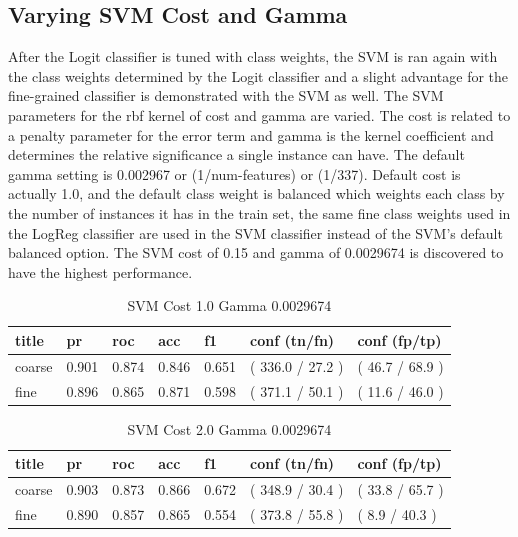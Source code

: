 \documentclass[ms]{nuthesis}
\begin{document}
\subsection{Varying SVM Cost and Gamma}
\label{sect:paramEnd}
\par After the Logit classifier is tuned with class weights, the SVM is ran again with the
class weights determined by the Logit classifier and a slight advantage for the fine-grained
classifier is demonstrated with the SVM as well. The SVM parameters for the rbf
kernel of cost and gamma are varied. The cost is related to a penalty parameter for the error term
and gamma is the kernel coefficient and determines the relative significance a single instance can have.
The default gamma setting is 0.002967 or (1/num-features) or (1/337). Default
 cost is actually 1.0, and the default class weight is balanced which weights each class by
 the number of instances it has in the train set, the same fine class weights used in the LogReg
 classifier are used in the SVM classifier instead of the SVM's default balanced option. The SVM
  cost of 0.15 and gamma of 0.0029674 is discovered to have the highest performance.


\FloatBarrier
\begin{table}[H]
\centering
\caption{SVM Cost 1.0 Gamma 0.0029674}
\label{tab:SVM-C1-Gp0029674}
\begin{tabular}{|l||l||l||l||l||l||l|}\toprule
title & pr & roc & acc & f1 & conf (tn/fn) & conf (fp/tp) \\ \midrule
coarse & 0.901 & 0.874 & 0.846 & 0.651 & ( 336.0 / 27.2 ) & ( 46.7 / 68.9 ) \\
fine & 0.896 & 0.865 & 0.871 & 0.598 & ( 371.1 / 50.1 ) & ( 11.6 / 46.0 ) \\ \bottomrule
\end{tabular}
\end{table}
\FloatBarrier


\FloatBarrier
\begin{table}[H]
\centering
\caption{SVM Cost 2.0 Gamma 0.0029674}
\label{tab:SVM-C2-Gp0029674}
\begin{tabular}{|l||l||l||l||l||l||l|}\toprule
title & pr & roc & acc & f1 & conf (tn/fn) & conf (fp/tp) \\ \midrule
coarse & 0.903 & 0.873 & 0.866 & 0.672 & ( 348.9 / 30.4 ) & ( 33.8 / 65.7 ) \\
fine & 0.890 & 0.857 & 0.865 & 0.554 & ( 373.8 / 55.8 ) & ( 8.9 / 40.3 ) \\ \bottomrule
\end{tabular}
\end{table}
\FloatBarrier
\end{document}
